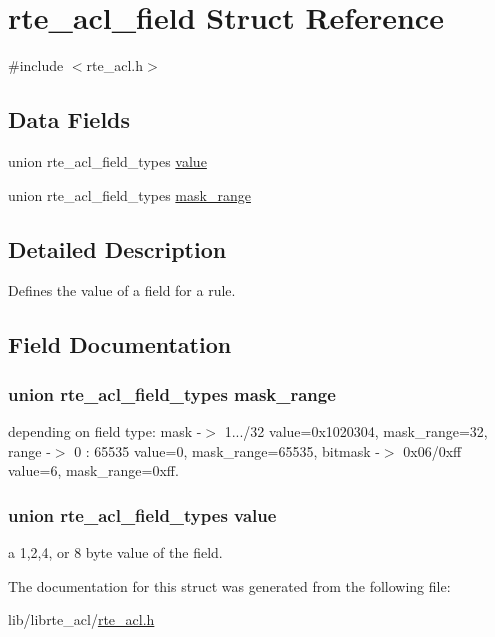 \hypertarget{structrte__acl__field}{}\section{rte\+\_\+acl\+\_\+field Struct Reference}
\label{structrte__acl__field}


{\ttfamily \#include $<$rte\+\_\+acl.\+h$>$}

\subsection*{Data Fields}
\begin{DoxyCompactItemize}
\item 
union rte\+\_\+acl\+\_\+field\+\_\+types \hyperlink{structrte__acl__field_ab397ea159dd9289ea3f71c67f938257a}{value}
\item 
union rte\+\_\+acl\+\_\+field\+\_\+types \hyperlink{structrte__acl__field_a7250bdac559be0f98d3aeb2397605a13}{mask\+\_\+range}
\end{DoxyCompactItemize}


\subsection{Detailed Description}
Defines the value of a field for a rule. 

\subsection{Field Documentation}
\hypertarget{structrte__acl__field_a7250bdac559be0f98d3aeb2397605a13}{}
\subsubsection[{mask\+\_\+range}]{\setlength{\rightskip}{0pt plus 5cm}union rte\+\_\+acl\+\_\+field\+\_\+types mask\+\_\+range}\label{structrte__acl__field_a7250bdac559be0f98d3aeb2397605a13}
depending on field type\+: mask -\/$>$ 1.../32 value=0x1020304, mask\+\_\+range=32, range -\/$>$ 0 \+: 65535 value=0, mask\+\_\+range=65535, bitmask -\/$>$ 0x06/0xff value=6, mask\+\_\+range=0xff. \hypertarget{structrte__acl__field_ab397ea159dd9289ea3f71c67f938257a}{}
\subsubsection[{value}]{\setlength{\rightskip}{0pt plus 5cm}union rte\+\_\+acl\+\_\+field\+\_\+types value}\label{structrte__acl__field_ab397ea159dd9289ea3f71c67f938257a}
a 1,2,4, or 8 byte value of the field. 

The documentation for this struct was generated from the following file\+:\begin{DoxyCompactItemize}
\item 
lib/librte\+\_\+acl/\hyperlink{rte__acl_8h}{rte\+\_\+acl.\+h}\end{DoxyCompactItemize}
